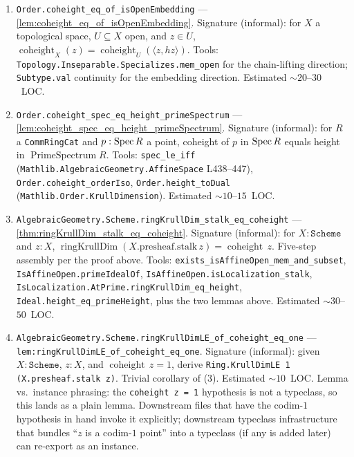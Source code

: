 \begin{enumerate}
  \item \texttt{Order.coheight\_eq\_of\_isOpenEmbedding} ---
    \cref{lem:coheight_eq_of_isOpenEmbedding}. Signature (informal): for
    \(X\) a topological space, \(U \subseteq X\) open, and \(z \in U\),
    \(\operatorname{coheight}_{X}(z) = \operatorname{coheight}_{U}(\langle z, hz\rangle)\).
    Tools: \texttt{Topology.Inseparable.Specializes.mem\_open} for the
    chain-lifting direction; \texttt{Subtype.val} continuity for the
    embedding direction. Estimated \(\sim 20\)--\(30\)~LOC.
  \item \texttt{Order.coheight\_spec\_eq\_height\_primeSpectrum} ---
    \cref{lem:coheight_spec_eq_height_primeSpectrum}. Signature (informal):
    for \(R\) a \texttt{CommRingCat} and \(p : \operatorname{Spec} R\) a point, coheight of \(p\)
    in \(\operatorname{Spec} R\) equals height in \(\operatorname{PrimeSpectrum} R\). Tools:
    \texttt{spec\_le\_iff} (\texttt{Mathlib.AlgebraicGeometry.AffineSpace} L438--447),
    \texttt{Order.coheight\_orderIso}, \texttt{Order.height\_toDual}
    (\texttt{Mathlib.Order.KrullDimension}). Estimated \(\sim 10\)--\(15\)~LOC.
  \item \texttt{AlgebraicGeometry.Scheme.ringKrullDim\_stalk\_eq\_coheight} ---
    \cref{thm:ringKrullDim_stalk_eq_coheight}. Signature (informal): for
    \(X : \texttt{Scheme}\) and \(z : X\),
    \(\operatorname{ringKrullDim}(X.\text{presheaf.stalk}\,z) =
    \operatorname{coheight}\,z\). Five-step assembly per the proof above.
    Tools: \texttt{exists\_isAffineOpen\_mem\_and\_subset},
    \texttt{IsAffineOpen.primeIdealOf}, \texttt{IsAffineOpen.isLocalization\_stalk},
    \texttt{IsLocalization.AtPrime.ringKrullDim\_eq\_height},
    \texttt{Ideal.height\_eq\_primeHeight}, plus the two lemmas above.
    Estimated \(\sim 30\)--\(50\)~LOC.
  \item \texttt{AlgebraicGeometry.Scheme.ringKrullDimLE\_of\_coheight\_eq\_one} ---
    \texttt{lem:ringKrullDimLE_of_coheight_eq_one}. Signature (informal):
    given \(X : \texttt{Scheme}\), \(z : X\), and \(\operatorname{coheight}\,z = 1\),
    derive \texttt{Ring.KrullDimLE 1 (X.presheaf.stalk z)}. Trivial corollary
    of (3). Estimated \(\sim 10\)~LOC. Lemma vs.\ instance phrasing: the
    \texttt{coheight\,z = 1} hypothesis is not a typeclass, so this lands as
    a plain lemma. Downstream files that have the codim-\(1\) hypothesis in
    hand invoke it explicitly; downstream typeclass infrastructure that
    bundles ``\(z\) is a codim-\(1\) point'' into a typeclass (if any is added
    later) can re-export as an instance.
\end{enumerate}

